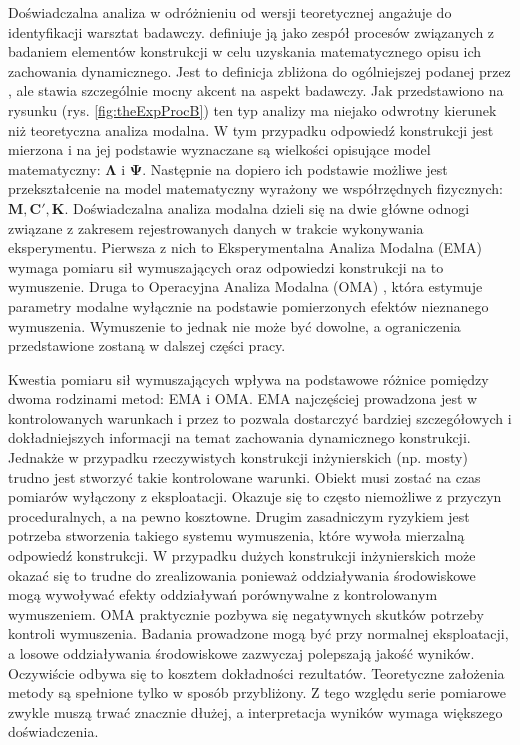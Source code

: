 Doświadczalna analiza w odróżnieniu od wersji teoretycznej angażuje do identyfikacji warsztat badawczy. \cite{Ewins2000} definiuje ją jako zespół procesów związanych z badaniem elementów konstrukcji w celu uzyskania matematycznego opisu ich zachowania dynamicznego. Jest to definicja zbliżona do ogólniejszej podanej przez \cite{Zhang2004}, ale stawia szczególnie mocny akcent na aspekt badawczy. Jak przedstawiono na rysunku (rys. \ref{fig:theExpProcB}) ten typ analizy ma niejako odwrotny kierunek niż teoretyczna analiza modalna. W tym przypadku odpowiedź konstrukcji jest mierzona i na jej podstawie wyznaczane są wielkości opisujące model matematyczny: $\mathbf{\Lambda}$ i $\mathbf{\Psi}$. Następnie na dopiero ich podstawie możliwe jest przekształcenie na model matematyczny wyrażony we współrzędnych fizycznych: $\mathbf{M}, \mathbf{C}', \mathbf{K}$. 
Doświadczalna analiza modalna dzieli się na dwie główne odnogi związane z zakresem rejestrowanych danych w trakcie wykonywania eksperymentu. Pierwsza z nich to Eksperymentalna Analiza Modalna (EMA)  wymaga pomiaru sił wymuszających oraz odpowiedzi konstrukcji na to wymuszenie. Druga to Operacyjna Analiza Modalna (OMA) , która estymuje parametry modalne wyłącznie na podstawie pomierzonych efektów nieznanego wymuszenia. Wymuszenie to jednak nie może być dowolne, a ograniczenia przedstawione zostaną w dalszej części pracy. 

Kwestia pomiaru sił wymuszających wpływa na podstawowe różnice pomiędzy dwoma rodzinami metod: EMA i OMA. EMA najczęściej prowadzona jest w kontrolowanych warunkach i przez to pozwala dostarczyć bardziej szczegółowych i dokładniejszych informacji na temat zachowania dynamicznego konstrukcji. Jednakże w przypadku rzeczywistych konstrukcji inżynierskich (np. mosty) trudno jest stworzyć takie kontrolowane warunki. Obiekt musi zostać na czas pomiarów wyłączony z eksploatacji. Okazuje się to często niemożliwe z przyczyn proceduralnych, a na pewno kosztowne. Drugim zasadniczym ryzykiem jest potrzeba stworzenia takiego systemu wymuszenia, które wywoła mierzalną odpowiedź konstrukcji. W przypadku dużych konstrukcji inżynierskich może okazać się to trudne do zrealizowania ponieważ oddziaływania środowiskowe mogą wywoływać efekty oddziaływań porównywalne z kontrolowanym wymuszeniem. OMA praktycznie pozbywa się negatywnych skutków potrzeby kontroli wymuszenia. Badania prowadzone mogą być przy normalnej eksploatacji, a losowe oddziaływania środowiskowe zazwyczaj polepszają jakość wyników. Oczywiście odbywa się to kosztem dokładności rezultatów. Teoretyczne założenia metody są spełnione tylko w sposób przybliżony. Z tego względu serie pomiarowe zwykle muszą trwać znacznie dłużej, a interpretacja wyników wymaga większego doświadczenia.

